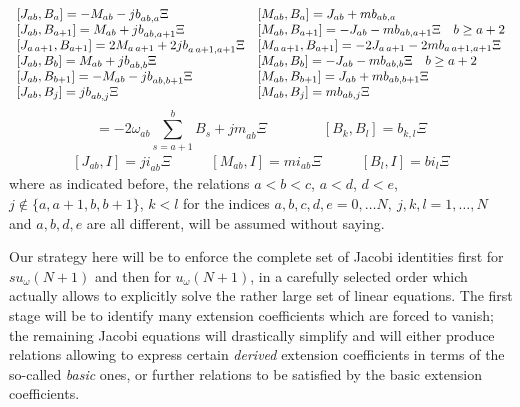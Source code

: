 \documentclass[12pt]{article}
\begin{document}
\begin{equation}
\begin{array}{ll}
[{J}_{ab},{B}_a]=-{M}_{ab}-{jb}_{ab,a}\Xi &
[{M}_{ab},{B}_a]={J}_{ab}+{mb}_{ab,a} \cr
[{J}_{ab},{B}_{a+1}]={M}_{ab}+{jb}_{ab,a+1}\Xi &
[{M}_{ab},{B}_{a+1}]=-{J}_{ab}-{mb}_{ab,a+1}\Xi \quad  b\ge a+2\cr
[{J}_{a\,a+1},{B}_{a+1}]=2{M}_{a\,a+1}+2{jb}_{a\,a+1,a+1}\Xi
& [{M}_{a\,a+1},{B}_{a+1}]=-2{J}_{a\,a+1}-2{mb}_{a\,a+1,a+1} \Xi\cr
[{J}_{ab},{B}_{b}]={M}_{ab}+{jb}_{ab,b}\Xi&
[{M}_{ab},{B}_{b}]=-{J}_{ab}-{mb}_{ab,b}\Xi \quad b\ge a+2\cr
[{J}_{ab},{B}_{b+1}]=-{M}_{ab}-{jb}_{ab,b+1}\Xi&
[{M}_{ab},{B}_{b+1}]={J}_{ab}+{mb}_{ab,b+1}\Xi \cr
[{J}_{ab},{B}_{j}]={jb}_{ab,j}\Xi &
[{M}_{ab},{B}_{j}]={mb}_{ab,j}\Xi
\end{array}
\label{CKsuExtB}
\end{equation}
\begin{equation}
[{J}_{ab},{M}_{ab}]=-2{\omega}_{ab}\sum_{s=a+1}^b {B}_s + {jm}_{ab} \Xi
\qquad\qquad
[{B}_k,{B}_l]={b}_{k,l} \Xi
\label{bf}
\end{equation}
\begin{equation}
\begin{array}{lll}
[{J}_{ab},{I}] = {ji}_{ab} \Xi & \qquad
[{M}_{ab},{I}] = {mi}_{ab} \Xi & \qquad
[{B}_l,{I}] = {bi}_l \Xi
\label{CKuExtC}
\end{array}
\end{equation}
where as indicated before, the relations $a<b<c$, $a<d$, $d<e$,   $j
\notin\{a,a+1,b,b+1\}$,
$k<l$ for the indices $a,b,c,d,e=0, \dots N, \ j,k,l=1,\dots, N$
and $a, b, d, e$ are all different, will be assumed without saying.

Our strategy here will be to enforce the complete set of Jacobi
identities  first for $su_{\omega}(N+1)$ and then for $u_{\omega}(N+1)$, in
a carefully selected order which actually allows to explicitly
solve the rather large set of linear equations. The first stage
will be to identify many extension coefficients which are forced to
vanish; the remaining Jacobi equations will drastically simplify
and will either produce relations allowing to express certain
\emph{derived} extension coefficients in terms of the so-called
\emph{basic} ones, or further relations to be satisfied by the basic
extension coefficients.
\end{document}
